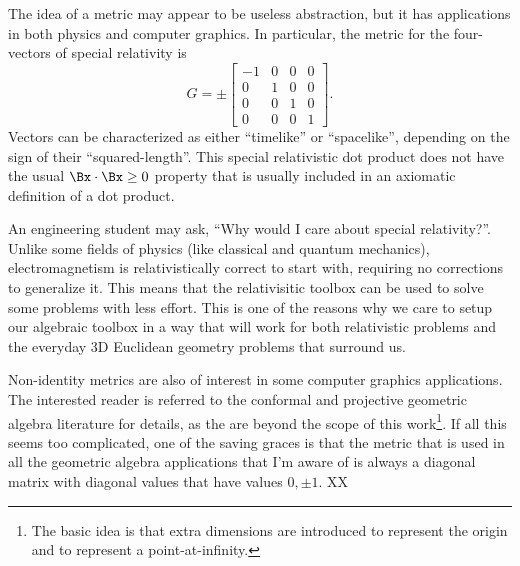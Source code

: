 The idea of a metric may appear to be useless abstraction, but it has applications in both physics and computer graphics.  In particular, the metric for the four-vectors of special relativity is
\begin{dmath}\label{eqn:multivector:120}
G =
\pm
\begin{bmatrix}
-1 & 0 & 0 & 0 \\
0 & 1 & 0 & 0 \\
0 & 0 & 1 & 0 \\
0 & 0 & 0 & 1
\end{bmatrix}.
\end{dmath}
Vectors can be characterized as either
``timelike'' or ``spacelike'', depending on the sign of their
``squared-length''.
This special relativistic dot product does not have the usual \( \Bx \cdot \Bx \ge 0 \) property that is usually included in an axiomatic definition of a dot product.

An engineering student may ask, ``Why would I care about special relativity?''.
Unlike some fields of physics (like classical and quantum mechanics), electromagnetism is relativistically correct to start with, requiring no corrections to generalize it.  This means that the relativisitic toolbox can be used to solve some problems with less effort.  This is one of the reasons why we care to setup our algebraic toolbox in a way that will work for both relativistic problems and the everyday 3D Euclidean geometry problems that surround us.

Non-identity metrics are also of interest in some computer graphics applications.  The interested reader is referred to the
conformal and projective geometric algebra literature for details, as the are beyond the scope of this work\footnote{The basic idea is that extra dimensions are introduced to represent the origin and to represent a point-at-infinity.}.
If all this seems too complicated, one of the saving graces is that the metric that is used in all the
geometric algebra applications that I'm aware of is always a
diagonal matrix with diagonal values that have values \( 0, \pm 1 \).
XX
